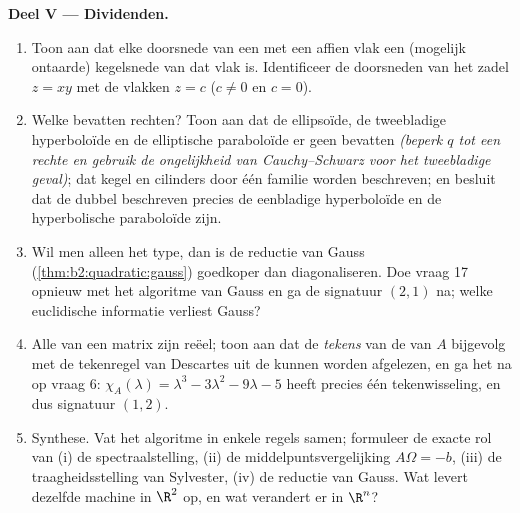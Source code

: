 \begin{problem}
\medskip
\noindent\textbf{Deel V --- Dividenden.}
\begin{enumerate}[resume]
  \item Toon aan dat elke doorsnede van een  met een
        affien vlak een (mogelijk ontaarde) kegelsnede van dat
        vlak is. Identificeer de doorsneden van het zadel $z = xy$
        met de vlakken $z = c$ ($c \neq 0$ en $c = 0$).
  \item Welke  bevatten rechten? Toon aan dat de
        ellipsoïde, de tweebladige hyperboloïde en de elliptische
        paraboloïde er geen bevatten \emph{(beperk $q$ tot een
        rechte en gebruik de ongelijkheid van Cauchy--Schwarz voor
        het tweebladige geval)}; dat kegel en cilinders door één
        familie worden beschreven; en besluit dat de dubbel
        beschreven  precies de eenbladige hyperboloïde
        en de hyperbolische paraboloïde zijn.
  \item Wil men alleen het \emph{} type, dan is de reductie
        van Gauss (\cref{thm:b2:quadratic:gauss}) goedkoper dan
        diagonaliseren. Doe vraag 17 opnieuw met het algoritme van
        Gauss en ga de signatuur $(2, 1)$ na; welke euclidische
        informatie verliest Gauss?
  \item Alle  van een  matrix zijn reëel;
        toon aan dat de \emph{tekens} van de  van $A$
        bijgevolg met de tekenregel van Descartes uit de
         kunnen worden afgelezen, en ga
        het na op vraag 6: $\chi_A(\lambda) = \lambda^3 -
        3\lambda^2 - 9\lambda - 5$ heeft precies één
        tekenwisseling, en dus signatuur $(1, 2)$.
  \item Synthese. Vat het algoritme in enkele regels samen;
        formuleer de exacte rol van (i) de spectraalstelling, (ii)
        de middelpuntsvergelijking $A\Omega = -b$, (iii) de
        traagheidsstelling van Sylvester, (iv) de reductie van
        Gauss. Wat levert dezelfde machine in $\R^2$ op, en wat
        verandert er in $\R^n$?
\end{enumerate}
\end{problem}
